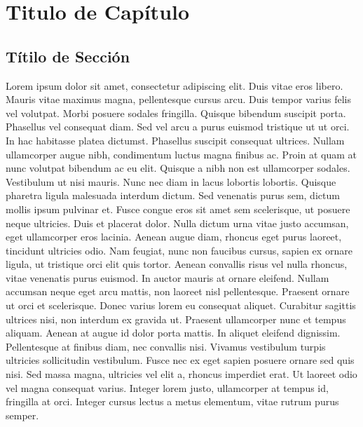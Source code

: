 \chapter{Titulo de Capítulo}
\section{Títilo de Sección} 
Lorem ipsum dolor sit amet, consectetur adipiscing
elit. Duis vitae eros libero. Mauris vitae maximus magna, pellentesque cursus
arcu. Duis tempor varius felis vel volutpat. 
Morbi posuere sodales fringilla.
Quisque bibendum suscipit porta. Phasellus vel consequat diam. Sed vel arcu a
purus euismod tristique ut ut orci. In hac habitasse platea dictumst. Phasellus
suscipit consequat ultrices. Nullam ullamcorper augue nibh, condimentum luctus
magna finibus ac. Proin at quam at nunc volutpat bibendum ac eu elit. Quisque a
nibh non est ullamcorper sodales. Vestibulum ut nisi mauris. Nunc nec diam in
lacus lobortis lobortis. Quisque pharetra ligula malesuada interdum dictum. Sed
venenatis purus sem, dictum mollis ipsum pulvinar et. Fusce congue eros sit amet
sem scelerisque, ut posuere neque ultricies. Duis et placerat dolor. Nulla
dictum urna vitae justo accumsan, eget ullamcorper eros lacinia. Aenean augue
diam, rhoncus eget purus laoreet, tincidunt ultricies odio. Nam feugiat, nunc
non faucibus cursus, sapien ex ornare ligula, ut tristique orci elit quis tortor.
Aenean convallis risus vel nulla rhoncus, vitae venenatis purus euismod. In
auctor mauris at ornare eleifend. Nullam accumsan neque eget arcu mattis, non
laoreet nisl pellentesque. Praesent ornare ut orci et scelerisque. Donec varius
lorem eu consequat aliquet. Curabitur sagittis ultrices nisi, non interdum ex
gravida ut. Praesent ullamcorper nunc et tempus aliquam. Aenean at augue id
dolor porta mattis. In aliquet eleifend dignissim. Pellentesque at finibus diam,
nec convallis nisi. Vivamus vestibulum turpis ultricies sollicitudin vestibulum.
Fusce nec ex eget sapien posuere ornare sed quis nisi. Sed massa magna,
ultricies vel elit a, rhoncus imperdiet erat. Ut laoreet odio vel magna
consequat varius. Integer lorem justo, ullamcorper at tempus id, fringilla at
orci. Integer cursus lectus a metus elementum, vitae rutrum purus semper.
